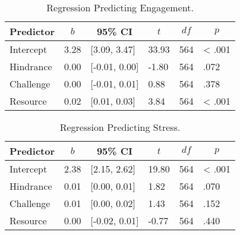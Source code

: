 \documentclass[
  man]{apa6}
\begin{document}
\begin{table}[tbp]

\begin{center}
\begin{threeparttable}

\caption{\label{tab:regression_table_eng}Regression Predicting Engagement.}

\begin{tabular}{llllll}
\toprule
Predictor & \multicolumn{1}{c}{$b$} & \multicolumn{1}{c}{95\% CI} & \multicolumn{1}{c}{$t$} & \multicolumn{1}{c}{$\mathit{df}$} & \multicolumn{1}{c}{$p$}\\
\midrule
Intercept & 3.28 & {}[3.09, 3.47] & 33.93 & 564 & < .001\\
Hindrance & 0.00 & {}[-0.01, 0.00] & -1.80 & 564 & .072\\
Challenge & 0.00 & {}[-0.01, 0.01] & 0.88 & 564 & .378\\
Resource & 0.02 & {}[0.01, 0.03] & 3.84 & 564 & < .001\\
\bottomrule
\end{tabular}

\end{threeparttable}
\end{center}

\end{table}

\begin{table}[tbp]

\begin{center}
\begin{threeparttable}

\caption{\label{tab:regression_table_str}Regression Predicting Stress.}

\begin{tabular}{llllll}
\toprule
Predictor & \multicolumn{1}{c}{$b$} & \multicolumn{1}{c}{95\% CI} & \multicolumn{1}{c}{$t$} & \multicolumn{1}{c}{$\mathit{df}$} & \multicolumn{1}{c}{$p$}\\
\midrule
Intercept & 2.38 & {}[2.15, 2.62] & 19.80 & 564 & < .001\\
Hindrance & 0.01 & {}[0.00, 0.01] & 1.82 & 564 & .070\\
Challenge & 0.01 & {}[0.00, 0.02] & 1.43 & 564 & .152\\
Resource & 0.00 & {}[-0.02, 0.01] & -0.77 & 564 & .440\\
\bottomrule
\end{tabular}

\end{threeparttable}
\end{center}

\end{table}
\end{document}
